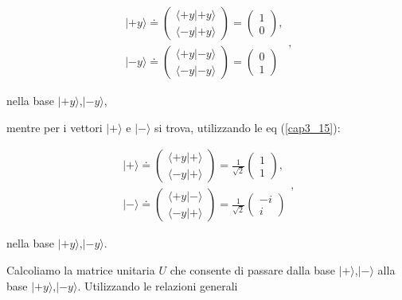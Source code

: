 \begin{equation}
\begin{array}{c}
| +y \rangle \doteq 
\begin{pmatrix}
\langle +y | +y \rangle\\
\langle -y | +y \rangle
\end{pmatrix}=
\begin{pmatrix}
1\\
0
\end{pmatrix}, \\
| -y \rangle \doteq 
\begin{pmatrix}
\langle +y | -y \rangle\\
\langle -y | -y \rangle
\end{pmatrix}=
\begin{pmatrix}
0\\
1
\end{pmatrix}
\end{array} ,
\end{equation}

nella base $| +y \rangle $,$| -y \rangle$, 

mentre per i vettori $| + \rangle $ e $| - \rangle$ si trova, utilizzando le eq (\ref{cap3_15}):

\begin{equation}
\begin{array}{c}
| + \rangle \doteq 
\begin{pmatrix}
\langle +y | + \rangle\\
\langle -y | + \rangle
\end{pmatrix}=
\frac{1}{\sqrt{2}}
\begin{pmatrix}
1\\
1
\end{pmatrix} ,\\
| - \rangle \doteq 
\begin{pmatrix}
\langle +y | - \rangle\\
\langle -y | + \rangle
\end{pmatrix}=
\frac{1}{\sqrt{2}}
\begin{pmatrix}
-i\\
i
\end{pmatrix}
\end{array} ,
\label{cap3_16}
\end{equation}

nella base $| +y \rangle $,$| -y \rangle$.

Calcoliamo la matrice unitaria $U$ che consente di passare dalla base $| + \rangle $,$| - \rangle $ alla base $| +y \rangle $,$| -y \rangle$. Utilizzando le relazioni generali

